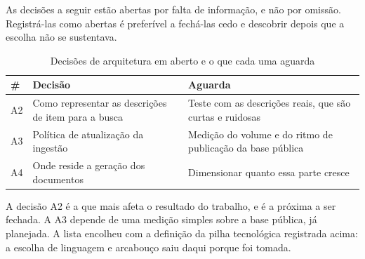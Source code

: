 As decisões a seguir estão abertas por falta de informação, e não por omissão.
Registrá-las como abertas é preferível a fechá-las cedo e descobrir depois que a
escolha não se sustentava.

\begin{table}[H]
  \centering
  \caption{Decisões de arquitetura em aberto e o que cada uma aguarda}
  \label{tab:decisoes-abertas}
  \begin{ufopaespacosimples}
  \small
  \begin{tabularx}{\textwidth}{@{}lXX@{}}
    \toprule
    \textbf{\#} & \textbf{Decisão} & \textbf{Aguarda} \\
    \midrule
    A2 & Como representar as descrições de item para a busca & Teste com as
      descrições reais, que são curtas e ruidosas \\
    A3 & Política de atualização da ingestão & Medição do volume e do ritmo de
      publicação da base pública \\
    A4 & Onde reside a geração dos documentos & Dimensionar quanto essa parte
      cresce \\
    \bottomrule
  \end{tabularx}
  \end{ufopaespacosimples}
\end{table}

A decisão A2 é a que mais afeta o resultado do trabalho, e é a próxima a ser
fechada. A A3 depende de uma medição simples sobre a base pública, já planejada.
A lista encolheu com a definição da pilha tecnológica registrada acima: a
escolha de linguagem e arcabouço saiu daqui porque foi tomada.
